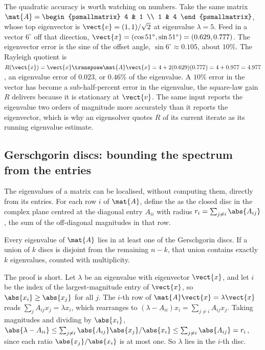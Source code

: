 \begin{example}
The quadratic accuracy is worth watching on numbers. Take the same
matrix $\mat{A} = \begin{psmallmatrix} 4 & 1 \\ 1 & 4
\end{psmallmatrix}$, whose top eigenvector is $\vect{v} = (1, 1)/
\sqrt{2}$ at eigenvalue $\lambda = 5$. Feed in a vector $6^{\circ}$
off that direction, $\vect{x} = (\cos 51^{\circ}, \sin 51^{\circ}) =
(0.629, 0.777)$. The eigenvector error is the sine of the offset
angle, $\sin 6^{\circ} \approx 0.105$, about $10\%$. The Rayleigh
quotient is $R(\vect{x}) = \vect{x}\transpose\mat{A}\vect{x} =
4 + 2(0.629)(0.777) = 4 + 0.977 = 4.977$, an eigenvalue error of
$0.023$, or $0.46\%$ of the eigenvalue. A $10\%$ error in the vector
has become a sub-half-percent error in the eigenvalue, the square-law
gain $R$ delivers because it is stationary at $\vect{v}$. The same
input reports the eigenvalue two orders of magnitude more accurately
than it reports the eigenvector, which is why an eigensolver quotes
$R$ of its current iterate as its running eigenvalue estimate.
\end{example}

\subsection{Gerschgorin discs: bounding the spectrum from the entries}

The eigenvalues of a matrix can be localised, without computing
them, directly from its entries. For each row $i$ of $\mat{A}$,
define the  as the closed disc in the
complex plane centred at the diagonal entry $A_{ii}$ with radius
$r_{i} = \sum_{j \neq i} \abs{A_{ij}}$, the sum of the
off-diagonal magnitudes in that row.

\begin{principle}
Every eigenvalue of $\mat{A}$ lies in at least one of the
Gerschgorin discs. If a union of $k$ discs is disjoint from the
remaining $n - k$, that union contains exactly $k$ eigenvalues,
counted with multiplicity.
\end{principle}

The proof is short. Let $\lambda$ be an eigenvalue with eigenvector
$\vect{x}$, and let $i$ be the index of the largest-magnitude entry
of $\vect{x}$, so $\abs{x_{i}} \geq \abs{x_{j}}$ for all $j$. The
$i$-th row of $\mat{A} \vect{x} = \lambda \vect{x}$ reads
$\sum_{j} A_{ij} x_{j} = \lambda x_{i}$, which rearranges to
$(\lambda - A_{ii}) x_{i} = \sum_{j \neq i} A_{ij} x_{j}$. Taking
magnitudes and dividing by $\abs{x_{i}}$,
$\abs{\lambda - A_{ii}} \leq \sum_{j \neq i} \abs{A_{ij}}
\abs{x_{j}}/\abs{x_{i}} \leq \sum_{j \neq i} \abs{A_{ij}} = r_{i}$,
since each ratio $\abs{x_{j}}/\abs{x_{i}}$ is at most one. So
$\lambda$ lies in the $i$-th disc.

